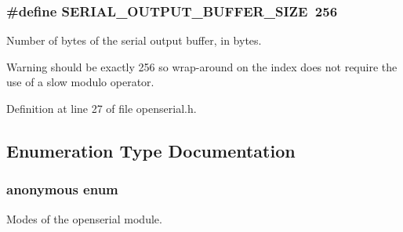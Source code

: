 \subsubsection[{\texorpdfstring{S\+E\+R\+I\+A\+L\+\_\+\+O\+U\+T\+P\+U\+T\+\_\+\+B\+U\+F\+F\+E\+R\+\_\+\+S\+I\+ZE}{SERIAL_OUTPUT_BUFFER_SIZE}}]{\setlength{\rightskip}{0pt plus 5cm}\#define S\+E\+R\+I\+A\+L\+\_\+\+O\+U\+T\+P\+U\+T\+\_\+\+B\+U\+F\+F\+E\+R\+\_\+\+S\+I\+ZE~256}\hypertarget{group___open_serial_gabfe80eb43785493f268187a201692d8e}{}\label{group___open_serial_gabfe80eb43785493f268187a201692d8e}


Number of bytes of the serial output buffer, in bytes. 

\begin{DoxyWarning}{Warning}
should be exactly 256 so wrap-\/around on the index does not require the use of a slow modulo operator. 
\end{DoxyWarning}


Definition at line 27 of file openserial.\+h.



\subsection{Enumeration Type Documentation}
\subsubsection[{\texorpdfstring{anonymous enum}{anonymous enum}}]{\setlength{\rightskip}{0pt plus 5cm}anonymous enum}\hypertarget{group___open_serial_ga1812ab31015cef0a41c6d4f3ae07f13d}{}\label{group___open_serial_ga1812ab31015cef0a41c6d4f3ae07f13d}


Modes of the openserial module. 

